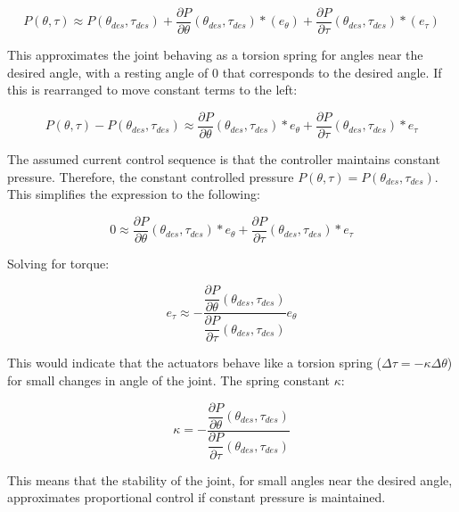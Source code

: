 \documentclass[12pt, letterpaper, oneside, notitlepage, onecolumn]{article}
\begin{document}
\begin{equation}
P(\theta, \tau) \approx P(\theta_{des}, \tau_{des}) + 
\dfrac{\partial P}{\partial \theta}(\theta_{des}, \tau_{des}) * (e_{\theta}) +
\dfrac{\partial P}{\partial \tau}(\theta_{des}, \tau_{des}) * (e_{\tau})
\end{equation}

This approximates the joint behaving as a torsion spring for angles near the
desired angle, with a resting angle of 0 that corresponds to the desired angle.
If this is rearranged to move constant terms to the left:

\begin{equation}
P(\theta, \tau) - P(\theta_{des}, \tau_{des})
\approx
\dfrac{\partial P}{\partial \theta}(\theta_{des}, \tau_{des}) * e_{\theta}
+ \dfrac{\partial P}{\partial \tau}(\theta_{des}, \tau_{des}) * e_{\tau}
\end{equation}

The assumed current control sequence is that the controller maintains constant
pressure. Therefore, the constant controlled pressure $P(\theta, \tau) = 
P(\theta_{des}, \tau_{des})$. This simplifies the expression to the following:

\begin{equation}
0
\approx
\dfrac{\partial P}{\partial \theta}(\theta_{des}, \tau_{des}) * e_{\theta}
+ \dfrac{\partial P}{\partial \tau}(\theta_{des}, \tau_{des}) * e_{\tau}
\end{equation}

Solving for torque:

\begin{equation}
e_{\tau}
\approx
- \dfrac{\dfrac{\partial P}{\partial \theta}(\theta_{des}, \tau_{des})}{
\dfrac{\partial P}{\partial \tau}(\theta_{des}, \tau_{des})}
e_{\theta}
\end{equation}

This would indicate that the actuators behave like a torsion spring ($\Delta \tau =
-\kappa \Delta \theta$) for small changes in angle of the joint. The spring constant $\kappa$:

\begin{equation}
\kappa
=
- \dfrac{\dfrac{\partial P}{\partial \theta}(\theta_{des}, \tau_{des})}{
\dfrac{\partial P}{\partial \tau}(\theta_{des}, \tau_{des})}
\end{equation}

This means that the stability of the joint, for small angles near the desired
angle, approximates proportional control if constant pressure is maintained.
\end{document}
